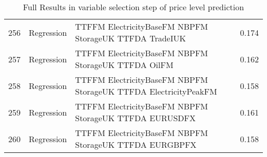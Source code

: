 \begin{table}[ht]
\begin{tabular}{rllr}
  256 & Regression & TTFFM ElectricityBaseFM NBPFM StorageUK TTFDA TradeIUK & 0.174 \\ 
  257 & Regression & TTFFM ElectricityBaseFM NBPFM StorageUK TTFDA OilFM & 0.162 \\ 
  258 & Regression & TTFFM ElectricityBaseFM NBPFM StorageUK TTFDA ElectricityPeakFM & 0.158 \\ 
  259 & Regression & TTFFM ElectricityBaseFM NBPFM StorageUK TTFDA EURUSDFX & 0.161 \\ 
  260 & Regression & TTFFM ElectricityBaseFM NBPFM StorageUK TTFDA EURGBPFX & 0.158 \\ 
   \hline
\end{tabular}
\caption{Full Results in variable selection step of price level prediction} 
\label{tab:level.var.selection.full}
\end{table}
